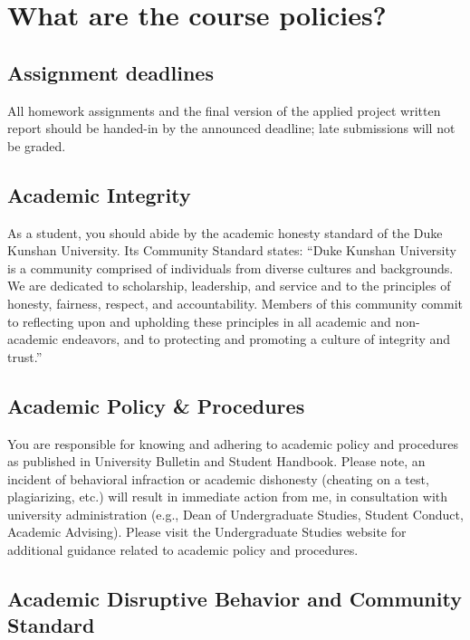 \documentclass[11pt]{article}
\begin{document}

\section{What are the course policies?}

\subsection{Assignment deadlines}

All homework assignments and the final version of the applied project written report should be handed-in by the announced deadline; late submissions will not be graded. 

\subsection{Academic Integrity}

As a student, you should abide by the academic honesty standard of the Duke Kunshan University. Its Community Standard states: “Duke Kunshan University is a community comprised of individuals from diverse cultures and backgrounds.  We are dedicated to scholarship, leadership, and service and to the principles of honesty, fairness, respect, and accountability. Members of this community commit to reflecting upon and upholding these principles in all academic and non-academic endeavors, and to protecting and promoting a culture of integrity and trust.”

\subsection{Academic Policy \& Procedures}

You are responsible for knowing and adhering to academic policy and procedures as published in University Bulletin and Student Handbook. Please note, an incident of behavioral infraction or academic dishonesty (cheating on a test, plagiarizing, etc.) will result in immediate action from me, in consultation with university administration (e.g., Dean of Undergraduate Studies, Student Conduct, Academic Advising).  Please visit the Undergraduate Studies website for additional guidance related to academic policy and procedures.

\subsection{Academic Disruptive Behavior and Community Standard}
\end{document}
